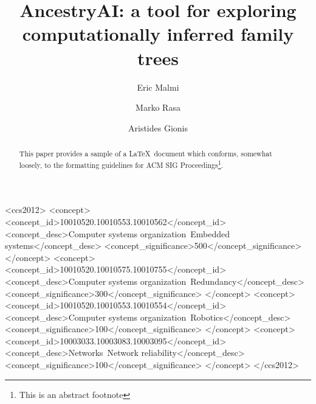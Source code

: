 \documentclass[sigconf]{acmart}
\begin{document}
\title{AncestryAI: a tool for exploring computationally inferred family trees}


\author{Eric Malmi}

\author{Marko Rasa}

\author{Aristides Gionis}



\begin{abstract}
This paper provides a sample of a \LaTeX\ document which conforms,
somewhat loosely, to the formatting guidelines for
ACM SIG Proceedings\footnote{This is an abstract footnote}. 
\end{abstract}

%
%
\begin{CCSXML}
<ccs2012>
 <concept>
  <concept_id>10010520.10010553.10010562</concept_id>
  <concept_desc>Computer systems organization~Embedded systems</concept_desc>
  <concept_significance>500</concept_significance>
 </concept>
 <concept>
  <concept_id>10010520.10010575.10010755</concept_id>
  <concept_desc>Computer systems organization~Redundancy</concept_desc>
  <concept_significance>300</concept_significance>
 </concept>
 <concept>
  <concept_id>10010520.10010553.10010554</concept_id>
  <concept_desc>Computer systems organization~Robotics</concept_desc>
  <concept_significance>100</concept_significance>
 </concept>
 <concept>
  <concept_id>10003033.10003083.10003095</concept_id>
  <concept_desc>Networks~Network reliability</concept_desc>
  <concept_significance>100</concept_significance>
 </concept>
</ccs2012>  
\end{CCSXML}
\end{document}

